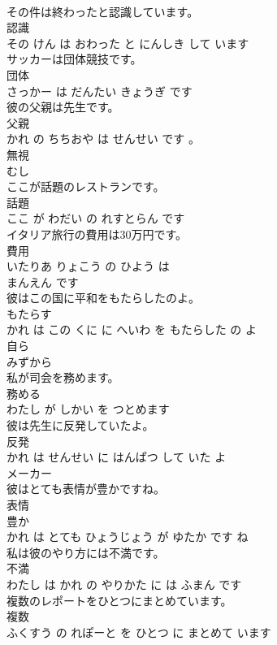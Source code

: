 \documentclass[8pt]{extreport}
\begin{document}
\begin{CJK}{UTF8}{min}
\\	その件は終わったと認識しています。	
\\	認識 
\\	その けん は おわった と にんしき して います			
\\	サッカーは団体競技です。	
\\	団体 
\\	さっかー は だんたい きょうぎ です			
\\	彼の父親は先生です。	
\\	父親 
\\	かれ の ちちおや は せんせい です 。			
\\	無視	
\\	むし		
\\	ここが話題のレストランです。	
\\	話題 
\\	ここ が わだい の れすとらん です			
\\	イタリア旅行の費用は30万円です。	
\\	費用 
\\	いたりあ りょこう の ひよう は 
\\	まんえん です			
\\	彼はこの国に平和をもたらしたのよ。	
\\	もたらす 
\\	かれ は この くに に へいわ を もたらした の よ			
\\	自ら	
\\	みずから		
\\	私が司会を務めます。	
\\	務める 
\\	わたし が しかい を つとめます			
\\	彼は先生に反発していたよ。	
\\	反発 
\\	かれ は せんせい に はんぱつ して いた よ			
\\	メーカー	
\\	彼はとても表情が豊かですね。	
\\	表情 
\\	豊か 
\\	かれ は とても ひょうじょう が ゆたか です ね			
\\	私は彼のやり方には不満です。	
\\	不満 
\\	わたし は かれ の やりかた に は ふまん です			
\\	複数のレポートをひとつにまとめています。	
\\	複数 
\\	ふくすう の れぽーと を ひとつ に まとめて います			

\end{CJK}
\end{document}
